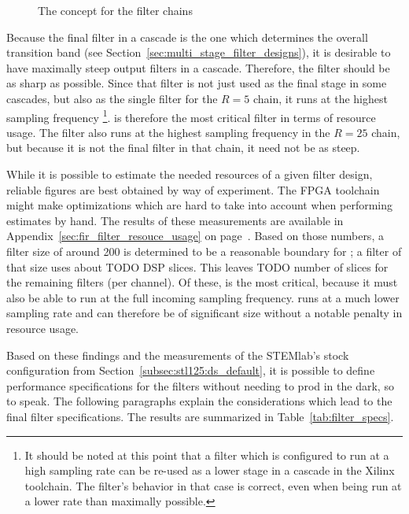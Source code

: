\begin{figure}
    \centering
    
    \caption[Filter Chain Concept]{The concept for the filter chains}
    \label{fig:fdesign:chain_concept}
\end{figure}

Because the final filter in a cascade  is the one which determines the overall
transition  band  (see  Section~\ref{sec:multi_stage_filter_designs}),  it  is
desirable to have maximally steep  output filters in a cascade. Therefore, the
filter  should be as sharp  as possible. Since that filter is not
just used as the  final stage in some cascades, but also  as the single filter
for the $R=5$ chain, it runs  at the highest sampling frequency%
\footnote{%
    It should be noted at this point  that a filter which is configured to run
    at a high  sampling rate can be re-used  as a lower stage in  a cascade in
    the Xilinx toolchain. The filter's behavior  in that case is correct, even
    when being run at a lower rate than maximally possible.%
}.
  is therefore  the most  critical  filter in  terms of  resource
usage. The filter  also runs  at the highest sampling frequency in
the $R=25$  chain, but because it  is not the  final filter in that  chain, it
need not be as steep.

While  it is  possible to  estimate  the needed  resources of  a given  filter
design,  reliable  figures  are  best   obtained  by  way  of  experiment. The
FPGA  toolchain  might  make  optimizations   which  are  hard  to  take  into
account   when  performing   estimates  by   hand.   The   results  of   these
measurements are  available in  Appendix~\ref{sec:fir_filter_resouce_usage} on
page~\pageref{sec:fir_filter_resouce_usage}. Based on those  numbers, a filter
size  of around  \num{200}  is  determined to  be  a  reasonable boundary  for
; a filter of that size uses about
TODO
DSP slices. This leaves
TODO
number  of  slices   for  the  remaining  filters   (per  channel). Of  these,
 is the most critical, because it  must also be able to run at the
full incoming sampling frequency.   runs at a much lower sampling
rate  and can therefore be of significant size without a notable penalty in
resource usage.

Based  on  these  findings  and   the  measurements  of  the  STEMlab's  stock
configuration from  Section~\ref{subsec:stl125:ds_default}, it is  possible to
define performance specifications  for the filters without needing  to prod in
the dark,  so to  speak. The following  paragraphs explain  the considerations
which lead to  the final filter specifications. The results  are summarized in
Table~\ref{tab:filter_specs}.

